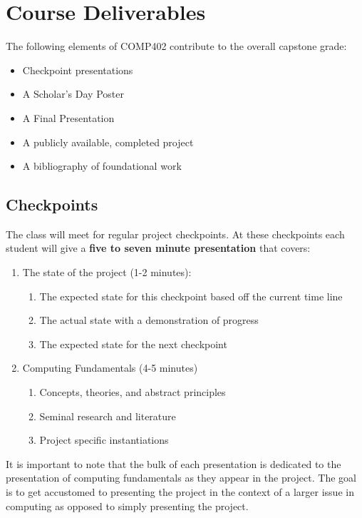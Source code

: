 \documentclass[10pt]{article}
\begin{document}
\section{Course Deliverables}

The following elements of COMP402 contribute to the overall capstone grade:
\begin{itemize}
\item Checkpoint presentations
\item A Scholar's Day Poster
\item A Final Presentation
\item A publicly available, completed project
\item A bibliography of foundational work
\end{itemize}


\subsection{Checkpoints}

The class will meet for regular project checkpoints. At these checkpoints each student will give a \textbf{five to seven minute presentation} that covers:
\begin{enumerate}
\item The state of the project (1-2 minutes): 
\begin{enumerate}
\item The expected state for this checkpoint based off the current time line 
\item The actual state with a demonstration of progress
\item The expected state for the next checkpoint
\end{enumerate}
\item Computing Fundamentals (4-5 minutes)
\begin{enumerate}
\item Concepts, theories, and abstract principles
\item Seminal research and literature
\item Project specific instantiations
\end{enumerate}
\end{enumerate}

It is important to note that the bulk of each presentation is dedicated to the presentation of computing fundamentals as they appear in the project. The goal is to get accustomed to presenting the project in the context of a larger issue in computing as opposed to simply presenting the project.
\end{document}
